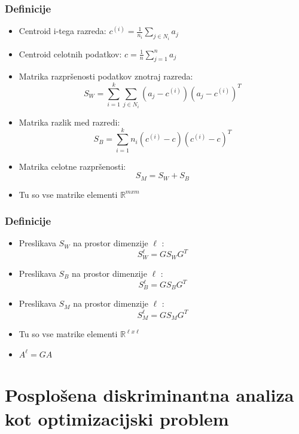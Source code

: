 \documentclass{beamer}
\begin{document}
\begin{frame}
\frametitle{Definicije}
\begin{itemize}
\item Centroid i-tega razreda: $c^{(i)} = \frac{1}{n_i} \sum_{j \in N_i} a_j$
\item Centroid celotnih podatkov: $c = \frac{1}{n} \sum_{j = 1}^{n} a_j$
\item Matrika razpršenosti podatkov znotraj razreda: $$S_W = \sum_{i = 1}^{k} \sum_{j \in N_i}(a_j - c^{(i)})(a_j - c^{(i)})^T$$
\item Matrika razlik med razredi: $$S_B = \sum_{i = 1}^{k} n_i ( c^{(i)} - c)( c^{(i)} - c)^T$$
\item Matrika celotne razpršenosti: $$S_M = S_W + S_B$$
\item Tu so vse matrike elementi $\mathbb{R}^{mxm}$
\end{itemize}
\end{frame}


\begin{frame}
\frametitle{Definicije}
\begin{itemize}
\item Preslikava $S_W$ na prostor dimenzije $\ell$ : $$ S_{W}^{\ell} = G S_W G^T$$
\item Preslikava $S_B$ na prostor dimenzije $\ell$ : $$ S_{B}^{\ell} = G S_B G^T$$
\item Preslikava $S_M$ na prostor dimenzije $\ell$ : $$ S_{M}^{\ell} = G S_M G^T$$
\item Tu so vse matrike elementi $\mathbb{R}^{ \ell x \ell } $
\item $A^\ell = G A$
\end{itemize}
\end{frame}



\section{Posplošena diskriminantna analiza kot optimizacijski problem}
\end{document}
